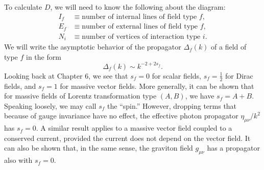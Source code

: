 To calculate $D$, we will need to know the following about the diagram:
\[
\begin{aligned}
I_f&\equiv\text{number of internal lines of field type }f,\\
E_f&\equiv\text{number of external lines of field type }f,\\
N_i&\equiv\text{number of vertices of interaction type }i.
\end{aligned}
\]
We will write the asymptotic behavior of the propagator $\Delta_f(k)$ of a
field of type $f$ in the form
\begin{equation}
  \Delta_f(k)\sim k^{-2+2s_f}.
  \tag{12.1.2}\label{eq:12.1.2}
\end{equation}
Looking back at Chapter 6, we see that $s_f=0$ for scalar fields,
$s_f=\tfrac12$ for Dirac fields, and $s_f=1$ for massive vector fields. More
generally, it can be shown that for massive fields of Lorentz transformation
type $(A,B)$, we have $s_f=A+B$. Speaking loosely, we may call $s_f$ the
``spin.'' However, dropping terms that because of gauge invariance have no
effect, the effective photon propagator $\eta_{\mu\nu}/k^2$ has $s_f=0$. A
similar result applies to a massive vector field coupled to a conserved
current, provided the current does not depend on the vector field. It can also
be shown that, in the same sense, the graviton field $g_{\mu\nu}$ has a
propagator also with $s_f=0$.

